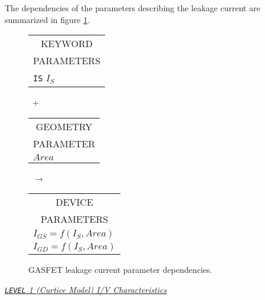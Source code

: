 The dependencies of the parameters describing the leakage current
are summarized in figure \ref{bleakage}.\\[0.2in]
\begin{figure}[h]
\begin{tabular}[t]{|p{1in}|}
\hline
\multicolumn{1}{|c|}{KEYWORD} \\
\multicolumn{1}{|c|}{PARAMETERS} \\
\hline
\hline
{\tt IS} \hfill $I_S$\\
\hline
\end{tabular}
\hfill
\parbox{0.2in}{\ \vspace*{0.2in}\newline +}
\hfill
\begin{tabular}[t]{|p{1in}|}
\hline
\multicolumn{1}{|c|}{GEOMETRY} \\
\multicolumn{1}{|c|}{PARAMETER} \\
\hline
$Area$\\
\hline
\end{tabular}
\hfill
\parbox{0.2in}{\ \vspace*{0.2in}\newline $\rightarrow$}
\hfill
\begin{tabular}[t]{|p{1.8in}|}
\hline
\multicolumn{1}{|c|}{DEVICE} \\
\multicolumn{1}{|c|}{PARAMETERS} \\
\hline
\hspace*{\fill}$I_{GS} = f(I_S, Area)$\\
\hspace*{\fill}$I_{GD} = f(I_S, Area)$\\
\hline
\end{tabular}
\caption{GASFET leakage current parameter dependencies. \label{bleakage}}
\end{figure}

\myline
\noindent\underline{\sl {\tt LEVEL} 1 (Curtice Model)
I/V Characteristics}\\[0.1in]

